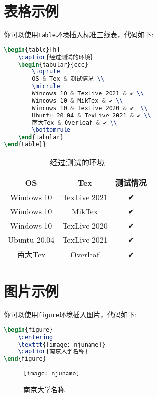 \documentclass[
    TitleLength=1,%
]{njuthesis}
\begin{document}
\section{表格示例}
你可以使用\lstinline|table|环境插入标准三线表，代码如下:
\begin{lstlisting}[language=TeX]
\begin{table}[h]
    \caption{经过测试的环境}
    \begin{tabular}{ccc}
        \toprule
        OS & Tex & 测试情况 \\
        \midrule
        Windows 10 & TexLive 2021 & ✔ \\
        Windows 10 & MikTex & ✔ \\
        Windows 10 & TexLive 2020 & ✔  \\
        Ubuntu 20.04 & TexLive 2021 & ✔ \\
        南大Tex & Overleaf & ✔ \\
        \bottomrule
    \end{tabular}
\end{table}}
\end{lstlisting}
\begin{table}[h]
    \caption{经过测试的环境}
    \begin{tabular}{ccc}
        \toprule
        OS & Tex & 测试情况 \\
        \midrule
        Windows 10 & TexLive 2021 & ✔ \\
        Windows 10 & MikTex & ✔ \\
        Windows 10 & TexLive 2020 & ✔  \\
        Ubuntu 20.04 & TexLive 2021 & ✔ \\
        南大Tex & Overleaf & ✔ \\
        \bottomrule
    \end{tabular}
\end{table}

\section{图片示例}
你可以使用\lstinline|figure|环境插入图片，代码如下:
\begin{lstlisting}[language=TeX]
\begin{figure}
    \centering
    \texttt{[image: njuname]}
    \caption{南京大学名称}
\end{figure}
\end{lstlisting}
\begin{figure}[htbp]
\centering
\texttt{[image: njuname]}
\caption{南京大学名称}
\end{figure}
\end{document}
